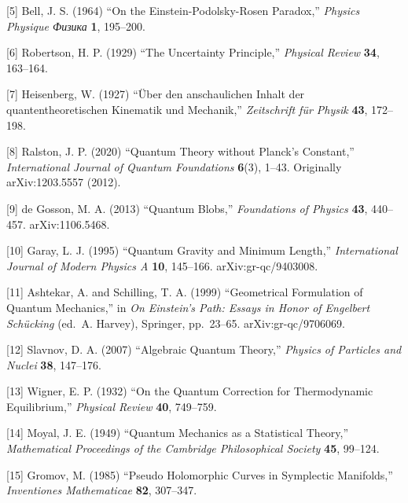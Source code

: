 \documentclass[
  11pt,
]{article}
\begin{document}
{[}5{]} Bell, J. S. (1964) ``On the Einstein-Podolsky-Rosen Paradox,''
\emph{Physics Physique Физика} \textbf{1}, 195--200.

{[}6{]} Robertson, H. P. (1929) ``The Uncertainty Principle,''
\emph{Physical Review} \textbf{34}, 163--164.

{[}7{]} Heisenberg, W. (1927) ``Über den anschaulichen Inhalt der
quantentheoretischen Kinematik und Mechanik,'' \emph{Zeitschrift für
Physik} \textbf{43}, 172--198.

{[}8{]} Ralston, J. P. (2020) ``Quantum Theory without Planck's
Constant,'' \emph{International Journal of Quantum Foundations}
\textbf{6}(3), 1--43. Originally arXiv:1203.5557 (2012).

{[}9{]} de Gosson, M. A. (2013) ``Quantum Blobs,'' \emph{Foundations of
Physics} \textbf{43}, 440--457. arXiv:1106.5468.

{[}10{]} Garay, L. J. (1995) ``Quantum Gravity and Minimum Length,''
\emph{International Journal of Modern Physics A} \textbf{10}, 145--166.
arXiv:gr-qc/9403008.

{[}11{]} Ashtekar, A. and Schilling, T. A. (1999) ``Geometrical
Formulation of Quantum Mechanics,'' in \emph{On Einstein's Path: Essays
in Honor of Engelbert Schücking} (ed.~A. Harvey), Springer, pp.~23--65.
arXiv:gr-qc/9706069.

{[}12{]} Slavnov, D. A. (2007) ``Algebraic Quantum Theory,''
\emph{Physics of Particles and Nuclei} \textbf{38}, 147--176.

{[}13{]} Wigner, E. P. (1932) ``On the Quantum Correction for
Thermodynamic Equilibrium,'' \emph{Physical Review} \textbf{40},
749--759.

{[}14{]} Moyal, J. E. (1949) ``Quantum Mechanics as a Statistical
Theory,'' \emph{Mathematical Proceedings of the Cambridge Philosophical
Society} \textbf{45}, 99--124.

{[}15{]} Gromov, M. (1985) ``Pseudo Holomorphic Curves in Symplectic
Manifolds,'' \emph{Inventiones Mathematicae} \textbf{82}, 307--347.
\end{document}

